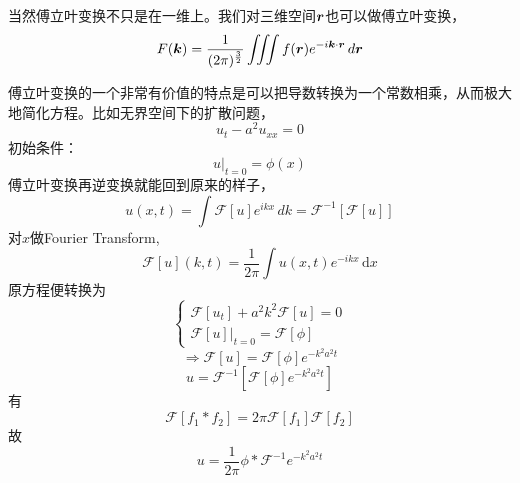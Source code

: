 \documentclass[12pt,a4paper,openany,twoside]{book}
\numberwithin{equation}{section}
\newcommand{\ud}{\mathrm{d}}
\begin{document}
        当然傅立叶变换不只是在一维上。我们对三维空间$\vb*{r}$也可以做傅立叶变换，
        \begin{equation*}
          F(\vb*{k}) = \frac{1}{(2\pi)^{\frac{3}{2}}} \iiint f(\vb*{r})  e^{-i\vb*{k}\cdot\vb*{r}  } \, d\vb*{r} 
        \end{equation*} 

        傅立叶变换的一个非常有价值的特点是可以把导数转换为一个常数相乘，从而极大地简化方程。比如无界空间下的扩散问题，
        \begin{equation*}
          u_t-a^2u_{xx} = 0
        \end{equation*} 
        初始条件：
        \begin{equation*}
          u\big|_{t=0} = \phi(x)
        \end{equation*} 
        傅立叶变换再逆变换就能回到原来的样子，
        \begin{equation*}
          u(x,t) = \int \mathcal{F}[u] e^{ikx} \, dk = \mathcal{F}^{-1}[\mathcal{F}[u]]
        \end{equation*} 
        对$x$做Fourier Transform,
        \begin{equation*}
          \mathcal{F}[u](k,t) = \frac{1}{2\pi} \int u(x,t) e^{-ikx} \, \ud x 
        \end{equation*} 
        原方程便转换为
        \begin{equation*}
          \begin{cases}
            \mathcal{F}[u_t] + a^2 k^2 \mathcal{F}[u] = 0 \\
            \mathcal{F}[u]\big|_{t=0} = \mathcal{F}[\phi]
          \end{cases}
        \end{equation*} 
        \begin{equation*}
          \Rightarrow \mathcal{F}[u] = \mathcal{F}[\phi] e^{-k^2 a^2 t}
        \end{equation*} 
        \begin{equation*}
          u = \mathcal{F}^{-1} [\mathcal{F}[\phi] e^{-k^2a^2 t}]
        \end{equation*} 
        有
        \begin{equation*}
          \mathcal{F}[f_1 * f_2] = 2\pi \mathcal{F}[f_1] \mathcal{F} [f_2]
        \end{equation*} 
        故
        \begin{equation*}
          u = \frac{1}{2\pi} \phi * \mathcal{F}^{-1} e^{-k^2 a^2 t} 
        \end{equation*} 
\end{document}
